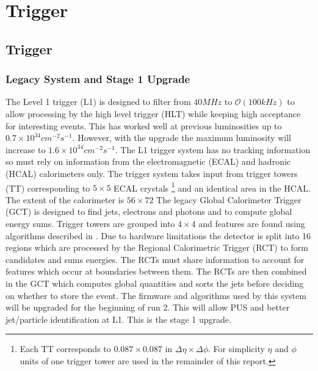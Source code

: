 
\chapter{Trigger} %

\label{Chapter4} %



\section{Trigger}
\subsection{Legacy System and Stage 1 Upgrade}
The Level 1 trigger (L1) is designed to filter from $40MHz$ to $\mathcal{O}(100kHz)$ to allow processing by the high level trigger (HLT) while keeping high acceptance for interesting events. This has worked well at previous luminosities up to $0.7\times10^{34} cm^{-2}s^{-1}$. However, with the upgrade the maximum luminosity will increase to $1.6\times10^{34} cm^{-2}s^{-1}$. The L1 trigger system has no tracking information so must rely on information from the electromagnetic (ECAL) and hadronic (HCAL) calorimeters only\cite{gct}. The trigger system takes input from  trigger towers (TT) corresponding to $5\times5$ ECAL crystals \footnote{Each TT corresponds to $0.087\times0.087$ in $\Delta\eta\times\Delta\phi$. For simplicity $\eta$ and $\phi$ units of one trigger tower are used in the remainder of this report.} and an identical area in the HCAL. The extent of the calorimeter is $56\times72$ The legacy Global Calorimeter Trigger (GCT) is designed to find jets, electrons and photons and to compute global energy sums. Trigger towers are grouped into $4\times4$ and features are found using algorithms described in \cite{algos}. Due to hardware limitations the detector is split into 16 regions which are processed by the Regional Calorimetric Trigger (RCT) to form candidates and sums energies. The RCTs must share information to account for features which occur at boundaries between them. The RCTs are then combined in the GCT which computes global quantities and sorts the jets before deciding on whether to store the event. The firmware and algorithms used by this system will be upgraded for the beginning of run 2. This will allow PUS and better jet/particle identification at L1. This is the stage 1 upgrade. 
